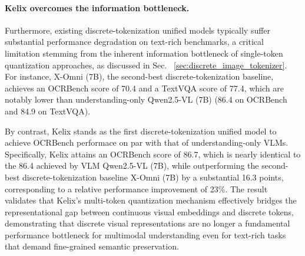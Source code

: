\documentclass[11pt, a4paper, logo, copyright]{googledeepmind}
\begin{document}
\paragraph{Kelix overcomes the information bottleneck.}
Furthermore, existing discrete-tokenization unified models typically suffer substantial performance degradation on text-rich benchmarks, a critical limitation stemming from the inherent information bottleneck of single-token quantization approaches, as discussed in Sec. ~\ref{sec:discrete_image_tokenizer}. For instance, X-Omni (7B), the second-best discrete-tokenization baseline, achieves an OCRBench score of 70.4 and a TextVQA score of 77.4, which are notably lower than understanding-only Qwen2.5-VL (7B) (86.4 on OCRBench and 84.9 on TextVQA). %

By contrast, Kelix stands as the first discrete-tokenization unified model to achieve OCRBench performace on par with that of understanding-only VLMs. Specifically, Kelix attains an OCRBench score of 86.7, which is nearly identical to the 86.4 achieved by VLM Qwen2.5-VL (7B), while outperforming the second-best discrete-tokenization baseline X-Omni (7B) by a substantial 16.3 points, corresponding to a relative performance improvement of 23\%. The result validates that Kelix’s multi-token quantization mechanism effectively bridges the representational gap between continuous visual embeddings and discrete tokens, demonstrating that discrete visual representations are no longer a fundamental performance bottleneck for multimodal understanding even for text-rich tasks that demand fine-grained semantic preservation.

\end{document}
